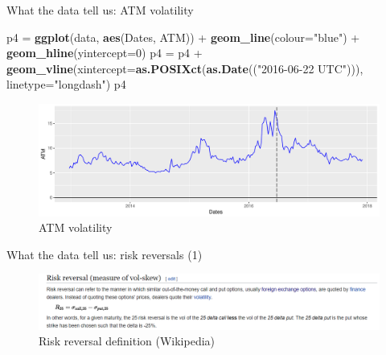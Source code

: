\documentclass[ignorenonframetext,aspectratio=169]{beamer}
\newenvironment{Shaded}{}{}
\newcommand{\KeywordTok}[1]{\textcolor[rgb]{0.00,0.44,0.13}{\textbf{#1}}}
\newcommand{\DataTypeTok}[1]{\textcolor[rgb]{0.56,0.13,0.00}{#1}}
\newcommand{\DecValTok}[1]{\textcolor[rgb]{0.25,0.63,0.44}{#1}}
\newcommand{\StringTok}[1]{\textcolor[rgb]{0.25,0.44,0.63}{#1}}
\newcommand{\OperatorTok}[1]{\textcolor[rgb]{0.40,0.40,0.40}{#1}}
\newcommand{\NormalTok}[1]{#1}
\begin{document}
\begin{frame}[fragile]{What the data tell us: ATM volatility}

\begin{Shaded}
\begin{Highlighting}[]
\NormalTok{p4 =}\StringTok{ }\KeywordTok{ggplot}\NormalTok{(data, }\KeywordTok{aes}\NormalTok{(Dates, ATM)) }\OperatorTok{+}\StringTok{ }\KeywordTok{geom_line}\NormalTok{(}\DataTypeTok{colour=}\StringTok{"blue"}\NormalTok{) }\OperatorTok{+}\StringTok{ }
\StringTok{        }\KeywordTok{geom_hline}\NormalTok{(}\DataTypeTok{yintercept=}\DecValTok{0}\NormalTok{)}
\NormalTok{p4 =}\StringTok{ }\NormalTok{p4 }\OperatorTok{+}\StringTok{ }\KeywordTok{geom_vline}\NormalTok{(}\DataTypeTok{xintercept=}\KeywordTok{as.POSIXct}\NormalTok{(}\KeywordTok{as.Date}\NormalTok{((}\StringTok{"2016-06-22 UTC"}\NormalTok{))),}
                     \DataTypeTok{linetype=}\StringTok{"longdash"}\NormalTok{)}
\NormalTok{p4}
\end{Highlighting}
\end{Shaded}

\begin{figure}
\includegraphics[width=1\linewidth]{2018_02_07_IMF_FXCourse_files/figure-beamer/unnamed-chunk-11-1} \caption{ATM volatility}\label{fig:unnamed-chunk-11}
\end{figure}

\end{frame}

\begin{frame}{What the data tell us: risk reversals (1)}

\begin{figure}
\includegraphics[width=1\linewidth]{images/figRRDefinition} \caption{Risk reversal definition (Wikipedia)}\label{fig:unnamed-chunk-12}
\end{figure}

\end{frame}
\end{document}
